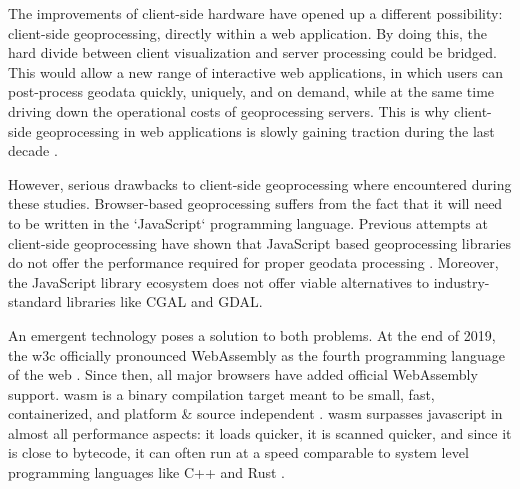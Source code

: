 The improvements of client-side hardware have opened up a different possibility: client-side geoprocessing, directly within a web application. By doing this, the hard divide between client visualization and server processing could be bridged. This would allow a new range of interactive web applications, in which users can post-process geodata quickly, uniquely, and on demand, while at the same time driving down the operational costs of geoprocessing servers. This is why client-side \ac{geoprocessing} in web applications is slowly gaining traction during the last decade \cite{kulawiak_analysis_2019, panidi_hybrid_2015, hamilton_client-side_2014}. 


However, serious drawbacks to client-side geoprocessing where encountered during these studies. Browser-based geoprocessing suffers from the fact that it will need to be written in the `JavaScript` programming language. Previous attempts at client-side geoprocessing have shown that JavaScript based geoprocessing libraries do not offer the performance required for proper geodata processing \cite{hamilton_client-side_2014}. 
Moreover, the JavaScript library ecosystem does not offer viable alternatives to industry-standard libraries like CGAL and GDAL. 

An emergent technology poses a solution to both problems. At the end of 2019, the \ac{w3c} officially pronounced WebAssembly as the fourth programming language of the web \cite{w3c_world_2019}. Since then, all major browsers have added official WebAssembly support. \ac{wasm} is a binary compilation target meant to be small, fast, containerized, and platform \& source independent \cite{haas_bringing_2017}. \ac{wasm} surpasses javascript in almost all performance aspects: it loads quicker, it is scanned quicker, and since it is close to bytecode, it can often run at a speed comparable to system level programming languages like C++ and Rust \cite{jangda_not_2019}. 

